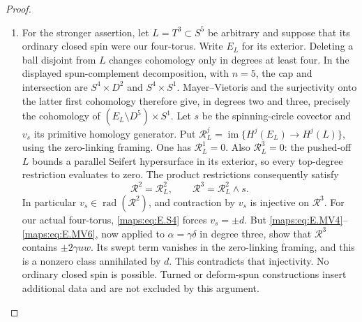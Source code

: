 \begin{proof}
\begin{enumerate}[label=\arabic*.,leftmargin=*]
\item For the stronger assertion, let $L=T^3\subset S^5$ be arbitrary
and suppose that its ordinary closed spin were our four-torus.
Write $E_L$ for its exterior. Deleting a ball disjoint from
$L$ changes cohomology only in degrees at least four. In the
displayed spun-complement decomposition, with $n=5$, the cap
and intersection are $S^4\times D^2$ and $S^4\times S^1$.
Mayer--Vietoris and the surjectivity onto the latter first
cohomology therefore give, in degrees two and three, precisely
the cohomology of $(E_L\setminus D^5)\times S^1$.
Let $s$ be the spinning-circle covector and $v_s$ its primitive
homology generator. Put $\mathcal R_L^j=\operatorname{im}
\{H^j(E_L)\to H^j(L)\}$, using the zero-linking framing.
One has $\mathcal R_L^1=0$. Also $\mathcal R_L^3=0$:
the pushed-off $L$ bounds a parallel Seifert hypersurface in
its exterior, so every top-degree restriction evaluates to
zero. The product restrictions consequently satisfy
\[
       \mathcal R^2=\mathcal R_L^2,\qquad
       \mathcal R^3=\mathcal R_L^2\wedge s.
 \tag{E.S12}\label{maps:eq:E.S12}
\]
In particular $v_s\in\operatorname{rad}(\mathcal R^2)$,
and contraction by $v_s$ is injective on $\mathcal R^3$.
For our actual four-torus, \eqref{maps:eq:E.S4} forces $v_s=\pm d$.
But \eqref{maps:eq:E.MV4}--\eqref{maps:eq:E.MV6}, now applied to $\alpha=\gamma\delta$
in degree three, show that $\mathcal R^3$ contains
$\pm2\gamma uw$. Its swept term vanishes in the zero-linking
framing, and this is a nonzero class annihilated by $d$.
This contradicts that injectivity. No ordinary closed spin
is possible. Turned or deform-spun constructions insert
additional data and are not excluded by this argument.
\end{enumerate}
\end{proof}

